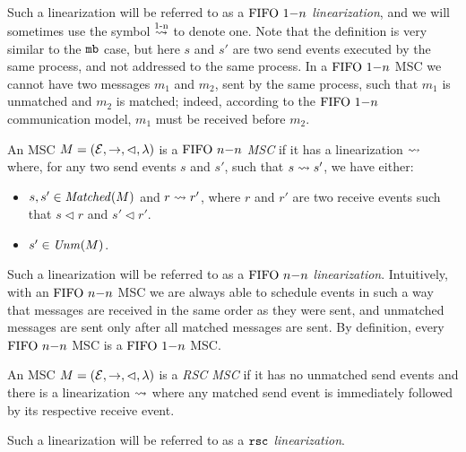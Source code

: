 Such a linearization will be referred to as a \emph{$\text{FIFO } 1\mathsf{-}n$ linearization}, and we will sometimes use the symbol $\overset{\text{1-n}}{\rightsquigarrow}$ to denote one. Note that the definition is very similar to the $\mathtt{mb}$ case, but here $s$ and $s'$ are two send events executed by the same process, and not addressed to the same process. In a $\text{FIFO } 1\mathsf{-}n$ MSC we cannot have two messages $m_1$ and $m_2$, sent by the same process, such that $m_1$ is unmatched and $m_2$ is matched; indeed, according to the $\text{FIFO } 1\mathsf{-}n$ communication model, $m_1$ must be received before $m_2$.


\begin{definition}[$\nn$ MSC]\label{def:n_n}
	An MSC $M = (\mathcal{E},\to,\lhd,\lambda)$ is a \emph{$\nn$ MSC} if it has a linearization $\rightsquigarrow$ where, for any two send events $s$ and $s'$, such that $s \rightsquigarrow s'$, we have either:
	\begin{itemize}\itemsep=0.5ex
		\item $s,s' \in \mathit{Matched}(M)$ and $r \rightsquigarrow r'$, where $r$ and $r'$ are two receive events such that $s \lhd r$ and $s' \lhd r'$.
		\item $s' \in \mathit{Unm}(M)$.
	\end{itemize}
\end{definition}

Such a linearization will be referred to as a \emph{$\nn$ linearization}. Intuitively, with an $\nn$ MSC we are always able to schedule events in such a way that messages are received in the same order as they were sent, and unmatched messages are sent only after all matched messages are sent. By definition, every $\nn$ MSC is a $\text{FIFO } 1\mathsf{-}n$ MSC. 

\begin{definition}\label{def:rsc}
	An MSC $M = (\mathcal{E},\to,\lhd,\lambda)$ is a \emph{RSC MSC} if it has no unmatched send events and there is a linearization $\rightsquigarrow$ where any matched send event is immediately followed by its respective receive event.
\end{definition}

Such a linearization will be referred to as a \emph{$\mathtt{rsc}$ linearization}.


